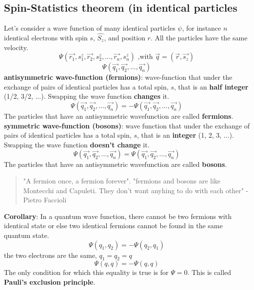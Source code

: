 \subsection{Spin-Statistics theorem (in identical particles}
Let's consider a wave function of many identical particles $\psi$, for instance $n$ identical electrons with spin $s$, $\hat{S_z}$, and position $r$. All the particles have the same velocity.\\
\[
\Psi(\vec{r_1}, s_1^z, \vec{r_2}, s_2^z, ..., \vec{r_n}, s_n^z) \text{   ,with } \vec{q}=(\vec{r},\vec{s_z})
\]
\[\Psi(\vec{q_1},\vec{q_2}, ..., \vec{q_n}) \]
\textbf{antisymmetric wave-function (fermions)}: wave-function that under the exchange of pairs of identical particles has a total spin, $s$, that is an \textbf{half integer} (1/2, 3/2, ...). Swapping the wave function \textbf{changes} it.\\
\[\Psi(\vec{q_1},\vec{q_2}, ..., \vec{q_n})=-\Psi(\vec{q_1},\vec{q_2}, ..., \vec{q_n})\]
The particles that have an antisymmetric wavefunction are called \textbf{fermions}.\\
\newline
\textbf{symmetric wave-function (bosons)}: wave function that under the exchange of pairs of identical particles has a total spin, $s$, that is an \textbf{integer} (1, 2, 3, ...). Swapping the wave function \textbf{doesn't change} it.\\
\[\Psi(\vec{q_1},\vec{q_2}, ..., \vec{q_n})=\Psi(\vec{q_1},\vec{q_2}, ..., \vec{q_n})\]
The particles that have an antisymmetric wavefunction are called \textbf{bosons}.
\begin{quote}
"A fermion once, a fermion forever".
"fermions and bosons are like Montecchi and Capuleti. They don't want anyhing to do with each other"
- Pietro Faccioli
\end{quote}
\noindent
\textbf{Corollary}: In a quantum wave function, there cannot be two fermions with identical state or else two identical fermions cannot be found in the same quantum state.
\[\Psi(q_1, q_2)= -\Psi(q_2,q_1)\] the two electrons are the same, $q_1=q_2=q$
\[\Psi(q,q)=-\Psi(q,q) \]
The only condition for which this equality is true is for  $\Psi = 0$. This is called \textbf{Pauli's exclusion principle}.
\\
